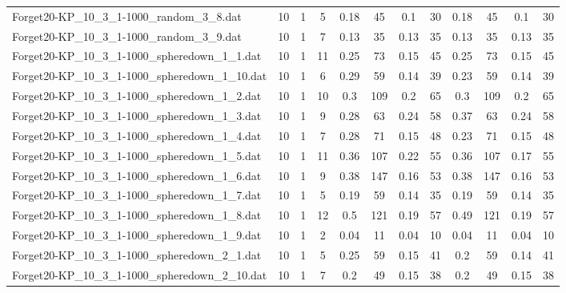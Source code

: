 \begin{sidewaystable}[!ht]
{\begin{tabular}{lccccccccccc}
Forget20-KP\_10\_3\_1-1000\_random\_3\_8.dat & 10 & 1 & 5 & 0.18 & 45 &  \textcolor{blue2}{0.1} & 30 & 0.18 & 45 &  \textcolor{blue2}{0.1} & 30 \\
Forget20-KP\_10\_3\_1-1000\_random\_3\_9.dat & 10 & 1 & 7 &  \textcolor{blue2}{0.13} & 35 &  \textcolor{blue2}{0.13} & 35 &  \textcolor{blue2}{0.13} & 35 &  \textcolor{blue2}{0.13} & 35 \\
Forget20-KP\_10\_3\_1-1000\_spheredown\_1\_1.dat & 10 & 1 & 11 & 0.25 & 73 &  \textcolor{blue2}{0.15} & 45 & 0.25 & 73 &  \textcolor{blue2}{0.15} & 45 \\
Forget20-KP\_10\_3\_1-1000\_spheredown\_1\_10.dat & 10 & 1 & 6 & 0.29 & 59 &  \textcolor{blue2}{0.14} & 39 & 0.23 & 59 &  \textcolor{blue2}{0.14} & 39 \\
Forget20-KP\_10\_3\_1-1000\_spheredown\_1\_2.dat & 10 & 1 & 10 & 0.3 & 109 &  \textcolor{blue2}{0.2} & 65 & 0.3 & 109 &  \textcolor{blue2}{0.2} & 65 \\
Forget20-KP\_10\_3\_1-1000\_spheredown\_1\_3.dat & 10 & 1 & 9 & 0.28 & 63 &  \textcolor{blue2}{0.24} & 58 & 0.37 & 63 &  \textcolor{blue2}{0.24} & 58 \\
Forget20-KP\_10\_3\_1-1000\_spheredown\_1\_4.dat & 10 & 1 & 7 & 0.28 & 71 &  \textcolor{blue2}{0.15} & 48 & 0.23 & 71 &  \textcolor{blue2}{0.15} & 48 \\
Forget20-KP\_10\_3\_1-1000\_spheredown\_1\_5.dat & 10 & 1 & 11 & 0.36 & 107 & 0.22 & 55 & 0.36 & 107 &  \textcolor{blue2}{0.17} & 55 \\
Forget20-KP\_10\_3\_1-1000\_spheredown\_1\_6.dat & 10 & 1 & 9 & 0.38 & 147 &  \textcolor{blue2}{0.16} & 53 & 0.38 & 147 &  \textcolor{blue2}{0.16} & 53 \\
Forget20-KP\_10\_3\_1-1000\_spheredown\_1\_7.dat & 10 & 1 & 5 & 0.19 & 59 &  \textcolor{blue2}{0.14} & 35 & 0.19 & 59 &  \textcolor{blue2}{0.14} & 35 \\
Forget20-KP\_10\_3\_1-1000\_spheredown\_1\_8.dat & 10 & 1 & 12 & 0.5 & 121 &  \textcolor{blue2}{0.19} & 57 & 0.49 & 121 &  \textcolor{blue2}{0.19} & 57 \\
Forget20-KP\_10\_3\_1-1000\_spheredown\_1\_9.dat & 10 & 1 & 2 &  \textcolor{blue2}{0.04} & 11 &  \textcolor{blue2}{0.04} & 10 &  \textcolor{blue2}{0.04} & 11 &  \textcolor{blue2}{0.04} & 10 \\
Forget20-KP\_10\_3\_1-1000\_spheredown\_2\_1.dat & 10 & 1 & 5 & 0.25 & 59 & 0.15 & 41 & 0.2 & 59 &  \textcolor{blue2}{0.14} & 41 \\
Forget20-KP\_10\_3\_1-1000\_spheredown\_2\_10.dat & 10 & 1 & 7 & 0.2 & 49 &  \textcolor{blue2}{0.15} & 38 & 0.2 & 49 &  \textcolor{blue2}{0.15} & 38 \\

\end{tabular}}
\end{sidewaystable}
